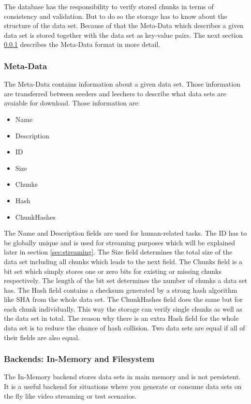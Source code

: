 The database has the responsibility to verify stored chunks in terms of consistency and validation. But to do so the storage has to know about the structure of the data set. Because of that the Meta-Data which describes a given data set is stored together with the data set as key-value pairs. The next section \ref{subsubsec:metadata} describes the Meta-Data format in more detail.

\subsubsection{Meta-Data}
\label{subsubsec:metadata}
The Meta-Data contains information about a given data set. Those information are transferred between seeders and leechers to describe what data sets are avaiable for download. Those information are:
\begin{itemize} 
\setlength{\parskip}{1pt}
\item Name
\item Description
\item ID
\item Size
\item Chunks
\item Hash
\item ChunkHashes
\end{itemize}
The Name and Description fields are used for human-related tasks. The ID has to be globally unique and is used for streaming purposes which will be explained later in section \ref{sec:streaming}. The Size field determines the total size of the data set including all chunks which leads to the next field. The Chunks field is a bit set which simply stores one or zero bits for existing or missing chunks respectively. The length of the bit set determines the number of chunks a data set has. The Hash field contains a checksum generated by a strong hash algorithm like SHA from the whole data set. The ChunkHashes field does the same but for each chunk individually. This way the storage can verify single chunks as well as the data set in total. The reason why there is an extra Hash field for the whole data set is to reduce the chance of hash collision. Two data sets are equal if all of their fields are also equal.

\subsubsection{Backends: In-Memory and Filesystem}
The In-Memory backend stores data sets in main memory and is not persistent. It is a useful backend for situations where you generate or consume data sets on the fly like video streaming or test scenarios.

